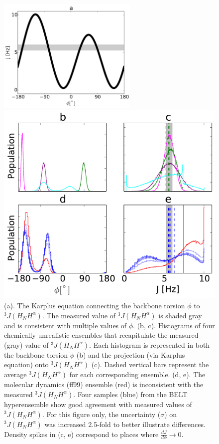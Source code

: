 \documentclass[journal=jacsat,manuscript=article]{achemso}
\begin{document}
\begin{figure}

\includegraphics[height=5.5cm]{figures/karplus_top_panel_karplus.pdf}

\includegraphics[height=10.0cm]{figures/karplus_2x2.pdf}

\caption{
(a).  The Karplus equation connecting the backbone torsion $\phi$ to $^3J(H_NH^\alpha)$.  The measured value of $^3J(H_NH^\alpha)$ is shaded gray and is consistent with multiple values of $\phi$.  (b, c).  Histograms of four chemically unrealistic ensembles that recapitulate the measured (gray) value of $^3J(H_NH^\alpha)$.  Each histogram is represented in both the backbone torsion $\phi$ (b) and the projection (via Karplus equation) onto $^3J(H_NH^\alpha)$ (c).  Dashed vertical bars represent the average $^3J(H_NH^\alpha)$ for each corresponding ensemble.  (d, e).  The molecular dynamics (ff99) ensemble (red) is inconsistent with the measured $^3J(H_NH^\alpha)$.  Four samples (blue) from the BELT hyperensemble show good agreement with measured values of $^3J(H_NH^\alpha)$.  For this figure only, the uncertainty ($\sigma$) on $^3J(H_NH^\alpha)$ was increased 2.5-fold to better illustrate differences.  Density spikes in (c, e) correspond to places where $\frac{dJ}{d\phi} \rightarrow 0$.  
}
\label{figure:Ambiguity}

\end{figure}
\end{document}
